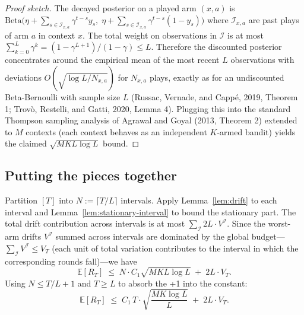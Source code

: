 \documentclass[11pt]{article}
\theoremstyle{definition}
\newcommand{\E}{\mathbb{E}}
\newcommand{\Beta}{\mathrm{Beta}}
\begin{document}
\begin{proof}[Proof sketch]
The decayed posterior on a played arm $(x,a)$ is $\Beta\!\big(\eta + \sum_{s \in \mathcal{I}_{x,a}} \gamma^{t-s} y_s,\; \eta + \sum_{s \in \mathcal{I}_{x,a}} \gamma^{t-s} (1-y_s)\big)$ where $\mathcal{I}_{x,a}$ are past plays of arm $a$ in context $x$. The total weight on observations in $\mathcal{I}$ is at most $\sum_{k=0}^{L} \gamma^k = (1-\gamma^{L+1})/(1-\gamma) \leq L$. Therefore the discounted posterior concentrates around the empirical mean of the most recent $L$ observations with deviations $O(\sqrt{\log L / N_{x,a}})$ for $N_{x,a}$ plays, exactly as for an undiscounted Beta-Bernoulli with sample size $L$ (Russac, Vernade, and Cappé, 2019, Theorem 1; Trovò, Restelli, and Gatti, 2020, Lemma 4). Plugging this into the standard Thompson sampling analysis of Agrawal and Goyal (2013, Theorem 2) extended to $M$ contexts (each context behaves as an independent $K$-armed bandit) yields the claimed $\sqrt{MKL \log L}$ bound.
\end{proof}

\subsection{Putting the pieces together}

Partition $[T]$ into $N := \lceil T/L \rceil$ intervals. Apply Lemma~\ref{lem:drift} to each interval and Lemma~\ref{lem:stationary-interval} to bound the stationary part. The total drift contribution across intervals is at most $\sum_{\mathcal{I}} 2 L \cdot V^{\mathcal{I}}$. Since the worst-arm drifts $V^{\mathcal{I}}$ summed across intervals are dominated by the global budget---$\sum_{\mathcal{I}} V^{\mathcal{I}} \leq V_T$ (each unit of total variation contributes to the interval in which the corresponding rounds fall)---we have
\begin{equation}
    \E[R_T] \;\leq\; N \cdot C_1 \sqrt{MKL \log L} \;+\; 2 L \cdot V_T.
    \label{eq:summed}
\end{equation}
Using $N \leq T/L + 1$ and $T \geq L$ to absorb the +1 into the constant:
\begin{equation}
    \E[R_T] \;\leq\; C_1 \,T \cdot \sqrt{\frac{MK \log L}{L}} \;+\; 2 L \cdot V_T.
    \label{eq:tradeoff}
\end{equation}
\end{document}
